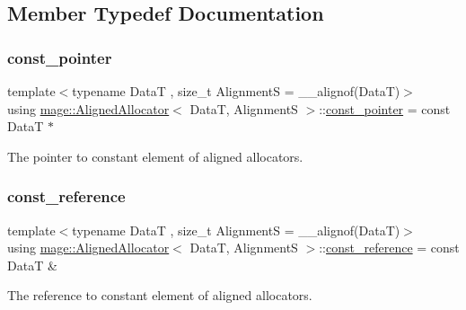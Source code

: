 \subsection{Member Typedef Documentation}
\hypertarget{structmage_1_1_aligned_allocator_a959cb724f93b205c290ff2ecbd146254}{}\label{structmage_1_1_aligned_allocator_a959cb724f93b205c290ff2ecbd146254} 
\subsubsection{\texorpdfstring{const\+\_\+pointer}{const\_pointer}}
{\footnotesize\ttfamily template$<$typename DataT , size\+\_\+t AlignmentS = \+\_\+\+\_\+alignof(\+Data\+T)$>$ \\
using \hyperlink{structmage_1_1_aligned_allocator}{mage\+::\+Aligned\+Allocator}$<$ DataT, AlignmentS $>$\+::\hyperlink{structmage_1_1_aligned_allocator_a959cb724f93b205c290ff2ecbd146254}{const\+\_\+pointer} =  const DataT $\ast$}

The pointer to constant element of aligned allocators. \hypertarget{structmage_1_1_aligned_allocator_a97c3aca3eba1b0a5a6c68d5c444b36e9}{}\label{structmage_1_1_aligned_allocator_a97c3aca3eba1b0a5a6c68d5c444b36e9} 
\subsubsection{\texorpdfstring{const\+\_\+reference}{const\_reference}}
{\footnotesize\ttfamily template$<$typename DataT , size\+\_\+t AlignmentS = \+\_\+\+\_\+alignof(\+Data\+T)$>$ \\
using \hyperlink{structmage_1_1_aligned_allocator}{mage\+::\+Aligned\+Allocator}$<$ DataT, AlignmentS $>$\+::\hyperlink{structmage_1_1_aligned_allocator_a97c3aca3eba1b0a5a6c68d5c444b36e9}{const\+\_\+reference} =  const DataT \&}

The reference to constant element of aligned allocators. \hypertarget{structmage_1_1_aligned_allocator_aa66abd74c38e5e565fca600a066a5915}{}\label{structmage_1_1_aligned_allocator_aa66abd74c38e5e565fca600a066a5915} 
